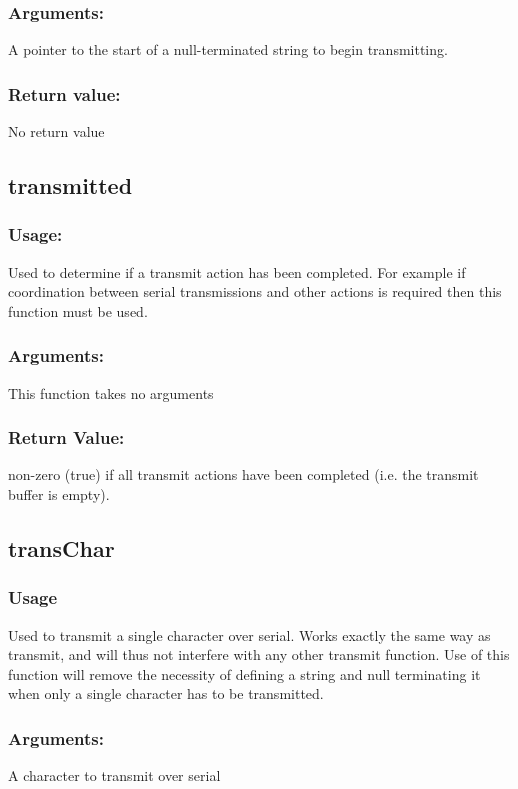\documentclass[]{report}
\begin{document}
\subsubsection{Arguments:}
A pointer to the start of a null-terminated string to begin transmitting.

\subsubsection{Return value:}
No return value

\subsection{transmitted}
\subsubsection{Usage:}
Used to determine if a transmit action has been completed. For example if coordination between serial transmissions and other actions is required then this function must be used.

\subsubsection{Arguments:}
This function takes no arguments

\subsubsection{Return Value:}
non-zero (true) if all transmit actions have been completed (i.e. the transmit buffer is empty).

\subsection{transChar}
\subsubsection{Usage}
Used to transmit a single character over serial. Works exactly the same way as transmit, and will thus not interfere with any other transmit function. Use of this function will remove the necessity of defining a string and null terminating it when only a single character has to be transmitted.

\subsubsection{Arguments:}
A character to transmit over serial
\end{document}
